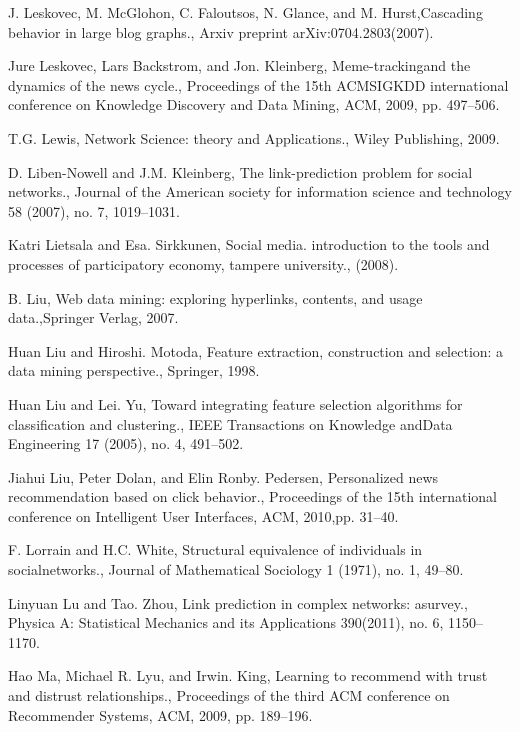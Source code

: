 \begin{thebibliography}{999}
 J. Leskovec, M. McGlohon, C. Faloutsos, N. Glance, and M. Hurst,Cascading behavior in large blog graphs., Arxiv preprint arXiv:0704.2803(2007).

 Jure Leskovec, Lars Backstrom, and Jon. Kleinberg, Meme-trackingand the dynamics of the news cycle., Proceedings of the 15th ACMSIGKDD international conference on Knowledge Discovery and Data Mining, ACM, 2009, pp. 497–506.

 T.G. Lewis, Network Science: theory and Applications., Wiley Publishing, 2009.

 D. Liben-Nowell and J.M. Kleinberg, The link-prediction problem for social networks., Journal of the American society for information science and technology 58 (2007), no. 7, 1019–1031.

 Katri Lietsala and Esa. Sirkkunen, Social media. introduction to the tools and processes of participatory economy, tampere university., (2008).

 B. Liu, Web data mining: exploring hyperlinks, contents, and usage data.,Springer Verlag, 2007.

 Huan Liu and Hiroshi. Motoda, Feature extraction, construction and selection: a data mining perspective., Springer, 1998.

 Huan Liu and Lei. Yu, Toward integrating feature selection algorithms for classification and clustering., IEEE Transactions on Knowledge andData Engineering 17 (2005), no. 4, 491–502.

 Jiahui Liu, Peter Dolan, and Elin Ronby. Pedersen, Personalized news recommendation based on click behavior., Proceedings of the 15th international conference on Intelligent User Interfaces, ACM, 2010,pp. 31–40.

 F. Lorrain and H.C. White, Structural equivalence of individuals in socialnetworks., Journal of Mathematical Sociology 1 (1971), no. 1, 49–80.

 Linyuan Lu and Tao. Zhou, Link prediction in complex networks: asurvey., Physica A: Statistical Mechanics and its Applications 390(2011), no. 6, 1150–1170.

 Hao Ma, Michael R. Lyu, and Irwin. King, Learning to recommend with trust and distrust relationships., Proceedings of the third ACM conference on Recommender Systems, ACM, 2009, pp. 189–196.


\end{thebibliography}
